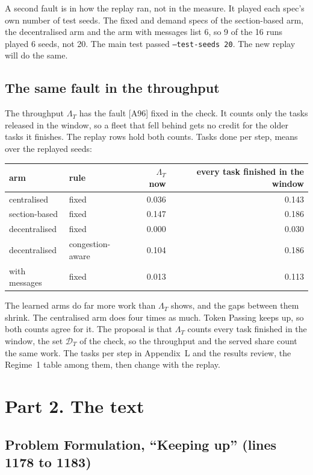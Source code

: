 \documentclass[11pt,a4paper]{article}
\begin{document}
A second fault is in how the replay ran, not in the measure. It played each spec's own number of test
seeds. The fixed and demand specs of the section-based arm, the decentralised arm and the arm with
messages list 6, so 9 of the 16 runs played 6 seeds, not 20. The main test passed \texttt{--test-seeds
20}. The new replay will do the same.

\subsection*{The same fault in the throughput}

The throughput $\Lambda_T$ has the fault [A96] fixed in the check. It counts only the tasks released
in the window, so a fleet that fell behind gets no credit for the older tasks it finishes. The
replay rows hold both counts. Tasks done per step, means over the replayed seeds:

\begin{center}
\begin{tabular}{llrr}
  \toprule
  arm & rule & $\Lambda_T$ now & every task finished in the window \\
  \midrule
  centralised & fixed & 0.036 & 0.143 \\
  section-based & fixed & 0.147 & 0.186 \\
  decentralised & fixed & 0.000 & 0.030 \\
  decentralised & congestion-aware & 0.104 & 0.186 \\
  with messages & fixed & 0.013 & 0.113 \\
  \bottomrule
\end{tabular}
\end{center}

The learned arms do far more work than $\Lambda_T$ shows, and the gaps between them shrink. The
centralised arm does four times as much. Token Passing keeps up, so both counts agree for it. The
proposal is that $\Lambda_T$ counts every task finished in the window, the set
$\mathcal{D}_T$ of the check, so the throughput and the served share count the same work. The
tasks per step in Appendix~L and the results review, the Regime~1 table among them, then change
with the replay.

\section*{Part 2. The text}

\subsection*{Problem Formulation, ``Keeping up'' (lines 1178 to 1183)}
\end{document}
